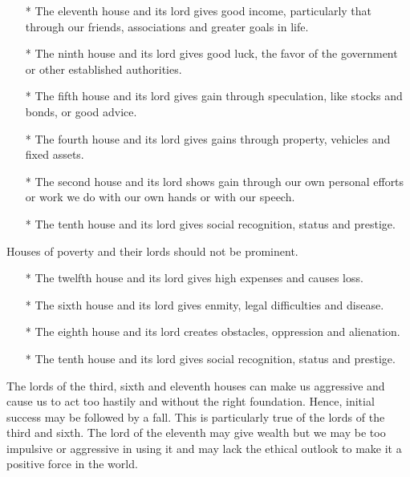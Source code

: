 \begin{enumerate}
\item[*] The eleventh house and its lord gives good income, particularly that through our friends, associations and greater goals in life.\\
\item[*] The ninth house and its lord gives good luck, the favor of the government or other established authorities.\\
\item[*] The fifth house and its lord gives gain through speculation, like stocks and bonds, or good advice.\\
\item[*] The fourth house and its lord gives gains through property, vehicles and fixed assets.\\
\item[*] The second house and its lord shows gain through our own personal efforts or work we do with our own hands or with our speech.\\
\item[*] The tenth house and its lord gives social recognition, status and prestige.\\
 \end{enumerate}

Houses of poverty and their lords should not be prominent.

 

\begin{enumerate}
\item[*] The twelfth house and its lord gives high expenses and causes loss.
\item[*] The sixth house and its lord gives enmity, legal difficulties and disease.
\item[*] The eighth house and its lord creates obstacles, oppression and alienation.
 \item[*] The tenth house and its lord gives social recognition, status and prestige.\\
 \end{enumerate}

The lords of the third, sixth and eleventh houses can make us aggressive and cause us to act too hastily and without the right foundation. Hence, initial success may be followed by a fall. This is particularly true of the lords of the third and sixth. The lord of the eleventh may give wealth but we may be too impulsive or aggressive in using it and may lack the ethical outlook to make it a positive force in the world.

